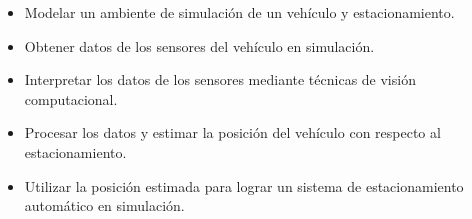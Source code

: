 \noindent
\begin{itemize}
    \item Modelar un ambiente de simulación de un vehículo y estacionamiento.
    \item Obtener datos de los sensores del vehículo en simulación.
    \item Interpretar los datos de los sensores mediante técnicas de visión computacional.
    \item Procesar los datos y estimar la posición del vehículo con respecto al estacionamiento.
    \item Utilizar la posición estimada para lograr un sistema de estacionamiento automático en simulación.
\end{itemize}